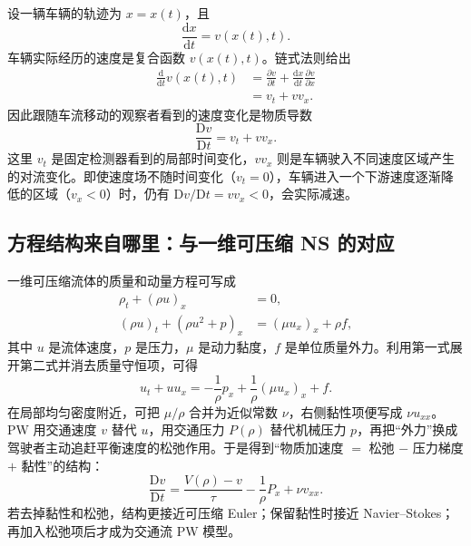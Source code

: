 \documentclass[11pt,a4paper,openany]{book}
\numberwithin{equation}{chapter}
\numberwithin{figure}{chapter}
\numberwithin{table}{chapter}
\begin{document}
设一辆车辆的轨迹为 $x=x(t)$，且
\begin{equation}
\frac{\mathrm dx}{\mathrm dt}=v(x(t),t).
\end{equation}
车辆实际经历的速度是复合函数 $v(x(t),t)$。链式法则给出
\begin{align}
\frac{\mathrm d}{\mathrm dt}v(x(t),t)
&=\frac{\partial v}{\partial t}
+\frac{\mathrm dx}{\mathrm dt}\frac{\partial v}{\partial x}\\
&=v_t+vv_x.
\end{align}
因此跟随车流移动的观察者看到的速度变化是物质导数
\begin{equation}
\frac{\mathrm Dv}{\mathrm Dt}=v_t+vv_x.
\label{eq:material-derivative}
\end{equation}
这里 $v_t$ 是固定检测器看到的局部时间变化，$vv_x$ 则是车辆驶入不同速度区域产生的对流变化。即使速度场不随时间变化（$v_t=0$），车辆进入一个下游速度逐渐降低的区域（$v_x<0$）时，仍有 $\mathrm Dv/\mathrm Dt=vv_x<0$，会实际减速。

\subsection{方程结构来自哪里：与一维可压缩 NS 的对应}

一维可压缩流体的质量和动量方程可写成
\begin{subequations}
\label{eq:ns-analogy}
\begin{align}
\rho_t+(\rho u)_x&=0,\\
(\rho u)_t+(\rho u^2+p)_x
&=(\mu u_x)_x+\rho f,
\end{align}
\end{subequations}
其中 $u$ 是流体速度，$p$ 是压力，$\mu$ 是动力黏度，$f$ 是单位质量外力。利用第一式展开第二式并消去质量守恒项，可得
\begin{equation}
u_t+uu_x
=-\frac{1}{\rho}p_x
+\frac{1}{\rho}(\mu u_x)_x+f.
\label{eq:ns-nonconservative}
\end{equation}
在局部均匀密度附近，可把 $\mu/\rho$ 合并为近似常数 $\nu$，右侧黏性项便写成 $\nu u_{xx}$。PW 用交通速度 $v$ 替代 $u$，用交通压力 $P(\rho)$ 替代机械压力 $p$，再把“外力”换成驾驶者主动追赶平衡速度的松弛作用。于是得到“物质加速度 $=$ 松弛 $-$ 压力梯度 $+$ 黏性”的结构\cite{payne1971}：
\begin{equation}
\boxed{
\frac{\mathrm Dv}{\mathrm Dt}
=\frac{V(\rho)-v}{\tau}
-\frac{1}{\rho}P_x
+\nu v_{xx}.}
\label{eq:pw-force-balance}
\end{equation}
若去掉黏性和松弛，结构更接近可压缩 Euler；保留黏性时接近 Navier--Stokes；再加入松弛项后才成为交通流 PW 模型。
\end{document}

